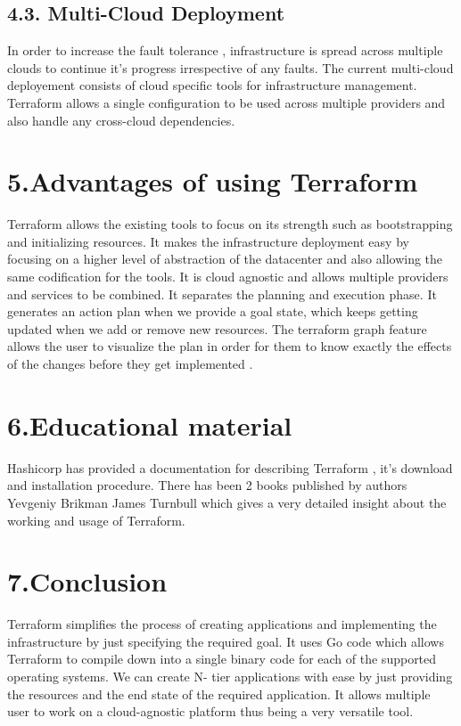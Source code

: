 \documentclass[9pt,twocolumn,twoside]{../../styles/osajnl}
\begin{document}
\subsection{4.3. Multi-Cloud Deployment}

In order to increase the fault tolerance , infrastructure is spread
across multiple clouds to continue it's progress irrespective of any
faults. The current multi-cloud deployement consists of cloud specific
tools for infrastructure management. Terraform allows a single
configuration to be used across multiple providers and also handle any
cross-cloud dependencies\cite{www-terraform}.

\section{5.Advantages of using Terraform}

Terraform allows the existing tools to focus on its strength such as
bootstrapping and initializing resources. It makes the infrastructure
deployment easy by focusing on a higher level of abstraction of the
datacenter and also allowing the same codification for the tools. It
is cloud agnostic and allows multiple providers and services to be
combined. It separates the planning and execution phase. It generates
an action plan when we provide a goal state, which keeps getting
updated when we add or remove new resources. The terraform graph
feature allows the user to visualize the plan in order for them to
know exactly the effects of the changes before they get implemented
\cite{www-terraform-othersoftware}.

\section{6.Educational material}

Hashicorp has provided a documentation for describing Terraform , it's
download and installation procedure. There has been 2 books published
by authors Yevgeniy Brikman\cite{www-terraform-upandrunning} James
Turnbull\cite{www-terraform-book} which gives a very detailed insight
about the working and usage of Terraform.

\section{7.Conclusion}
Terraform simplifies the process of creating applications and
implementing the infrastructure by just specifying the required
goal. It uses Go code which allows Terraform to compile down into a
single binary code for each of the supported operating systems. We can
create N- tier applications with ease by just providing the resources
and the end state of the required application. It allows multiple user
to work on a cloud-agnostic platform thus being a very versatile tool.
\end{document}
